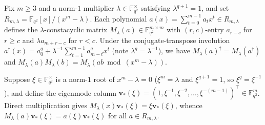 \documentclass[11pt,a4paper]{article}
\newcommand{\vb}[1]{\symbf{#1}}
\newcommand{\vb}[1]{\mathbf{#1}}
\theoremstyle{remark}
\begin{document}
Fix $m \ge 3$ and a norm-$1$ multiplier $\lambda \in \mathbb{F}_{q^2}^\times$ satisfying $\lambda^{q+1} = 1$, and set $R_{m,\lambda} = \mathbb{F}_{q^2}[x]/(x^m - \lambda)$. Each polynomial $a(x) = \sum_{t=0}^{m-1} a_t x^t \in R_{m,\lambda}$ defines the $\lambda$-constacyclic matrix $M_\lambda(a) \in \mathbb{F}_{q^2}^{m \times m}$ with $(r, c)$-entry $a_{r-c}$ for $r \ge c$ and $\lambda a_{m+r-c}$ for $r < c$. Under the conjugate-transpose involution $a^\dagger(x) = a_0^q + \lambda^{-1} \sum_{t=1}^{m-1} a_{m-t}^q x^t$ (note $\lambda^q = \lambda^{-1}$), we have $M_\lambda(a)^\dagger = M_\lambda(a^\dagger)$ and $M_\lambda(a) M_\lambda(b) = M_\lambda(ab \bmod (x^m - \lambda))$.

Suppose $\xi \in \mathbb{F}_{q^2}^\times$ is a norm-$1$ root of $x^m - \lambda = 0$ ($\xi^m = \lambda$ and $\xi^{q+1} = 1$, so $\xi^q = \xi^{-1}$), and define the eigenmode column $\vb{v}_*(\xi) = (1, \xi^{-1}, \xi^{-2}, \dots, \xi^{-(m-1)})^\top \in \mathbb{F}_{q^2}^m$. Direct multiplication gives $M_\lambda(x)\vb{v}_*(\xi) = \xi \vb{v}_*(\xi)$, whence $M_\lambda(a)\vb{v}_*(\xi) = a(\xi)\vb{v}_*(\xi)$ for all $a \in R_{m,\lambda}$.
\end{document}
